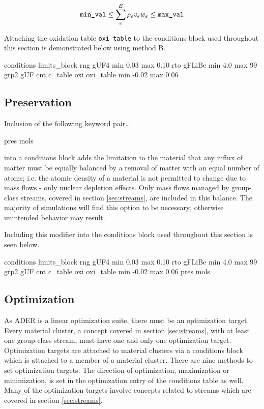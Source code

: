 \begin{equation}\label{eq:oxi_mb}
\text{\texttt{min\_val}} \leq \sum_{e}^{E} \rho_{e} v_{e} w_{e} \leq 
\text{\texttt{max\_val}}
\end{equation}

Attaching the oxidation table \texttt{oxi\_table} to the conditions block
used throughout this section is demonstrated below using method B.

\begin{li}
conditions limits_block
rng gUF4    min 0.03    max 0.10
rto gFLiBe  min 4.0 max 99  grp2    gUF
cnt c_table
oxi oxi_table min -0.02 max 0.06
\end{li}

\subsection{Preservation}\label{ssec:pres}
Inclusion of the following keyword pair\ldots

\begin{lt}
pres mols
\end{lt}

into a conditions block adds the limitation to the material that any influx
of matter must be equally balanced by a removal of matter with an equal number
of atoms; i.e. the atomic density of a material is not permitted to change due
to mass flows - only nuclear depletion effects. Only mass flows managed by
group-class streams, covered in section \ref{sec:streams}, are included in
this balance. The majority of simulations will
find this option to be necessary; otherwise unintended behavior may result. 

Including this modifier into the conditions block used throughout this section
is seen below.

\begin{li}
conditions limits_block
rng gUF4    min 0.03    max 0.10
rto gFLiBe  min 4.0 max 99  grp2    gUF
cnt c_table
oxi oxi_table min -0.02 max 0.06
pres mols
\end{li}

\subsection{Optimization}\label{ssec:optimization}
As ADER is a linear optimization suite, there must be an optimization target.
Every material cluster, a concept covered in section \ref{sec:streams}, with
at least one group-class stream, must have one and only one optimization
target. Optimization targets are attached to material clusters via a conditions
block which is attached to a member of a material cluster. There are nine
methods to set optimization targets. The direction of optimization, maximization
or minimization, is set in the optimization entry of the conditions table
as well. Many of the optimization targets involve concepts related to streams
which are covered in section \ref{sec:streams}.

